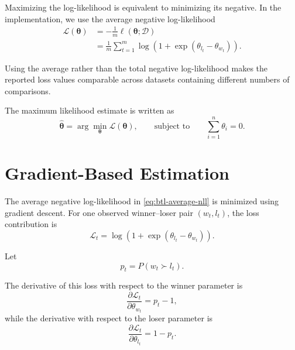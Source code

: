 \documentclass[12pt,oneside]{report}
\begin{document}
Maximizing the log-likelihood is equivalent to minimizing its negative.
In the implementation, we use the average negative log-likelihood
\begin{align}
    \mathcal{L}(\boldsymbol{\theta})
    &=
    -\frac{1}{m}
    \ell(\boldsymbol{\theta};\mathcal{D})
    \\
    &=
    \frac{1}{m}
    \sum_{t=1}^{m}
    \log
    \left(
        1+
        \exp(\theta_{l_t}-\theta_{w_t})
    \right).
    \label{eq:btl-average-nll}
\end{align}

Using the average rather than the total negative log-likelihood makes
the reported loss values comparable across datasets containing
different numbers of comparisons.

The maximum likelihood estimate is written as
\begin{equation}
    \widehat{\boldsymbol{\theta}}
    =
    \arg\min_{\boldsymbol{\theta}}
    \mathcal{L}(\boldsymbol{\theta}),
    \qquad
    \text{subject to}
    \qquad
    \sum_{i=1}^{n}\theta_i=0.
    \label{eq:btl-mle}
\end{equation}


\section{Gradient-Based Estimation}

The average negative log-likelihood in
\cref{eq:btl-average-nll} is minimized using gradient descent. For one
observed winner--loser pair \((w_t,l_t)\), the loss contribution is
\begin{equation}
    \mathcal{L}_t
    =
    \log
    \left(
        1+\exp(\theta_{l_t}-\theta_{w_t})
    \right).
\end{equation}

Let
\begin{equation}
    p_t
    =
    P(w_t\succ l_t).
\end{equation}

The derivative of this loss with respect to the winner parameter is
\begin{equation}
    \frac{\partial\mathcal{L}_t}
    {\partial\theta_{w_t}}
    =
    p_t-1,
    \label{eq:btl-winner-gradient}
\end{equation}
while the derivative with respect to the loser parameter is
\begin{equation}
    \frac{\partial\mathcal{L}_t}
    {\partial\theta_{l_t}}
    =
    1-p_t.
    \label{eq:btl-loser-gradient}
\end{equation}
\end{document}
